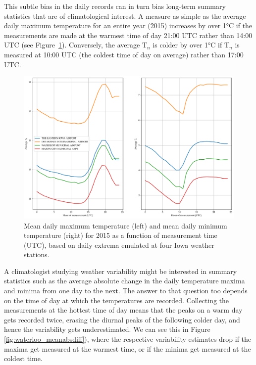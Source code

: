 \documentclass[letter]{article}
\makeatletter
\def\maxwidth{\ifdim\Gin@nat@width>\linewidth\linewidth
\else\Gin@nat@width\fi}
\let\Oldincludegraphics\includegraphics
\renewcommand{\includegraphics}[1]{\Oldincludegraphics[width=0.98\maxwidth]{#1}}
\newcommand{\T}{\mathrm{T}}
\newcommand{\Tn}{\T_{n}}
\makeatother
\begin{document}
        This subtle bias in the daily records can in turn bias long-term summary statistics that are of climatological interest.
A measure as simple as the average daily maximum temperature for an entire year (2015) increases by over 1°C if the measurements are made at the warmest time of day 21:00 UTC rather than 14:00 UTC (see Figure~\ref{fig:waterloo_avgTnTx}).
Conversely, the average \(\Tn\) is colder by over 1°C if \(\Tn\) is measured at 10:00 UTC (the coldest time of day on average) rather than 17:00 UTC.

\begin{figure}
\centering
\includegraphics{../figures/waterloo_avgTnTx.png}
\caption{\label{fig:waterloo_avgTnTx}
Mean daily maximum temperature (left)
and mean daily minimum temperature (right)
for 2015 as a function of measurement time (UTC),
based on daily extrema emulated at four Iowa weather stations.}
\end{figure}
    


        A climatologist studying weather variability might be interested in summary statistics such as the average absolute change in the daily temperature maxima and minima from one day to the next.
The answer to that question too depends on the time of day at which the temperatures are recorded.
Collecting the measurements at the hottest time of day means that the peaks on a warm day gets recorded twice,
erasing the diurnal peaks of the following colder day,
and hence the variability gets underestimated.
We can see this in Figure \ref{fig:waterloo_meanabsdiff}), where the respective variability estimates drop if the maxima get measured at the warmest time, or if the minima get measured at the coldest time.
\end{document}
